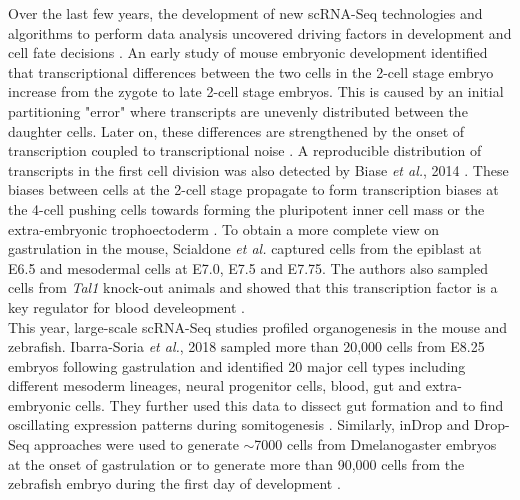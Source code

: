 Over the last few years, the development of new scRNA-Seq technologies and algorithms to perform data analysis uncovered driving factors in development and cell fate decisions \citep{Griffiths2018}. An early study of mouse embryonic development identified that transcriptional differences between the two cells in the 2-cell stage embryo increase from the zygote to late 2-cell stage embryos. This is caused by an initial partitioning "error" where transcripts are unevenly distributed between the daughter cells. Later on, these differences are strengthened by the onset of transcription coupled to transcriptional noise \citep{Piras2014, Shi2015a}. A reproducible distribution of transcripts in the first cell division was also detected by Biase \emph{et al.}, 2014 \cite{Biase2014}. These biases between cells at the 2-cell stage propagate to form transcription biases at the 4-cell pushing cells towards forming the pluripotent inner cell mass or the extra-embryonic trophoectoderm \citep{Goolam2016, Shi2015a}. To obtain a more complete view on gastrulation in the mouse, Scialdone \emph{et al.} captured cells from the epiblast at E6.5 and mesodermal cells at E7.0, E7.5 and E7.75. The authors also sampled cells from \emph{Tal1} knock-out animals and showed that this transcription factor is a key regulator for blood develeopment \citep{Scialdone2016}. \\

This year, large-scale scRNA-Seq studies profiled organogenesis in the mouse and zebrafish. Ibarra-Soria \emph{et al.}, 2018 sampled more than 20,000 cells from E8.25 embryos following gastrulation and identified 20 major cell types including different mesoderm lineages, neural progenitor cells, blood, gut and extra-embryonic cells. They further used this data to dissect gut formation and to find oscillating expression patterns during somitogenesis \citep{Ibarra-Soria2018}. Similarly, inDrop and Drop-Seq approaches were used to generate $\sim$7000 cells from \gls{Dmelanogaster} embryos at the onset of gastrulation \citep{Karaiskos2017} or to generate more than 90,000 cells from the zebrafish embryo during the first day of development \citep{Wagner2018}.\\

